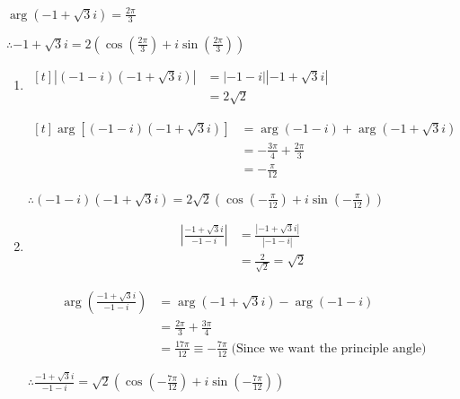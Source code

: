 \documentclass[11pt,a4paper]{book}
\begin{document}
\begin{example}
\begin{minipage}[t]{0.5\textwidth}
\begin{enumerate}[label=(\alph*),start=2]
${\displaystyle \arg\left(-1+\sqrt{3}i\right)=\frac{2\pi}{3}}$

${\displaystyle \therefore-1+\sqrt{3}i=2\left(\cos\left(\frac{2\pi}{3}\right)+i\sin\left(\frac{2\pi}{3}\right)\right)}$
\end{enumerate}
\end{minipage}

\begin{enumerate}[label=(\alph*),start=3]

\item
$
\begin{aligned}[t]
\left|\left(-1-i\right)\left(-1+\sqrt{3}i\right)\right| & =\left|-1-i\right|\left|-1+\sqrt{3}i\right|\\
 & =2\sqrt{2}
\end{aligned}
$

$
\begin{aligned}[t]
\arg\left[\left(-1-i\right)\left(-1+\sqrt{3}i\right)\right] & =\arg\left(-1-i\right)+\arg\left(-1+\sqrt{3}i\right)\\
 & =-\frac{3\pi}{4}+\frac{2\pi}{3}\\
 & =-\frac{\pi}{12}
\end{aligned}
$

${\displaystyle \therefore\left(-1-i\right)\left(-1+\sqrt{3}i\right)=2\sqrt{2}\left(\cos\left(-\frac{\pi}{12}\right)+i\sin\left(-\frac{\pi}{12}\right)\right)}$

\item
\begin{align*}
\left|\frac{-1+\sqrt{3}i}{-1-i}\right| & =\frac{\left|-1+\sqrt{3}i\right|}{\left|-1-i\right|}\\
 & =\frac{2}{\sqrt{2}}=\sqrt{2}
\end{align*}

\begin{align*}
\arg\left(\frac{-1+\sqrt{3}i}{-1-i}\right) & =\arg\left(-1+\sqrt{3}i\right)-\arg\left(-1-i\right)\\
 & =\frac{2\pi}{3}+\frac{3\pi}{4}\\
 & =\frac{17\pi}{12}\equiv-\frac{7\pi}{12}\;\text{(Since we want the principle angle)}
\end{align*}

${\displaystyle \therefore\frac{-1+\sqrt{3}i}{-1-i}=\sqrt{2}\left(\cos\left(-\frac{7\pi}{12}\right)+i\sin\left(-\frac{7\pi}{12}\right)\right)}$

\end{enumerate}

\end{example}
\end{document}
